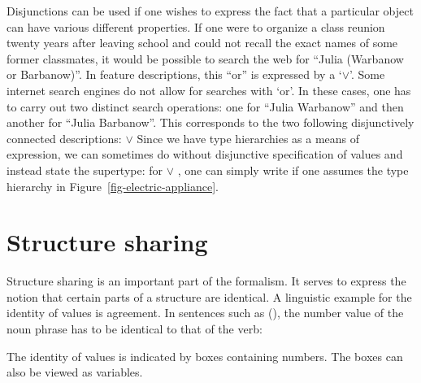 Disjunctions can be used if one wishes to express the fact that a particular object can have various different properties. If one were to organize a class reunion
twenty years after leaving school and could not recall the exact names of some former classmates, it would be possible to search the web for ``Julia (Warbanow or Barbanow)''. In
feature descriptions, this ``or'' is expressed by a `$\vee$'\is{$\vee$}.
\ea
{}
\z
Some internet search engines do not allow for searches with `or'. In these cases, one has to carry out two distinct search operations: one for ``Julia Warbanow'' and then another
for ``Julia Barbanow''. This corresponds to the two following disjunctively connected descriptions:
\ea
{} $\vee $
\z
Since we have type hierarchies as a means of expression, we can sometimes do without disjunctive specification of values and instead state the supertype:
for  $\vee$  , one can simply write  if one assumes the type hierarchy in Figure~\vref{fig-electric-appliance}.%

\section{Structure sharing}
\label{sec-strukturteilung}

Structure sharing is an important part of the formalism. It serves to express the notion that certain parts of a structure are identical. A linguistic
example for the identity of values is agreement. In sentences such as (), the number value of the noun phrase has to be identical to that of the verb:

\eal
{}
\zl
The identity of values is indicated by boxes containing numbers. The boxes can also be viewed as
variables.


